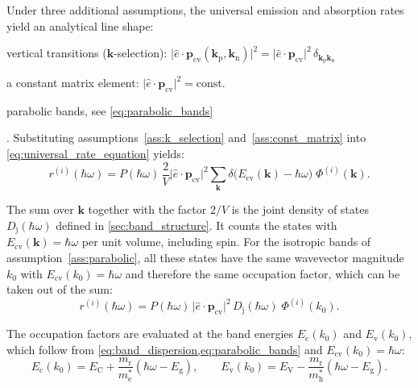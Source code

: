 Under three additional assumptions, the universal emission and absorption rates yield
an analytical line shape:
\begin{enumerate*}[label=(\roman{*}), ref=(\roman{*}), itemjoin={{; }}, itemjoin*={{; and }}]
	\item \label{ass:k_selection} vertical transitions ($\mathbf{k}$-selection):
		$\lvert \hat{e}\cdot \mathbf{p}_{\mathrm{cv}}(\mathbf{k}_{\mathrm{p}},\mathbf{k}
		_{\mathrm{n}}) \rvert^{2}=\lvert \hat{e}\cdot \mathbf{p}_{\mathrm{cv}}\rvert^{2}
		\, \delta_{\mathbf{k}_{\mathrm{p}} \mathbf{k}_{\mathrm{n}}}$
	\item \label{ass:const_matrix} a constant matrix element:
		$\lvert\hat e\cdot\mathbf{p}_{\mathrm{cv}}\rvert^{2}=\mathrm{const.}$
	\item \label{ass:parabolic} parabolic bands, see \cref{eq:parabolic_bands}
\end{enumerate*}.
Substituting assumptions~\ref{ass:k_selection} and~\ref{ass:const_matrix} into
\cref{eq:universal_rate_equation} yields:
\begin{equation}
	r^{(i)}(\hbar\omega)= P(\hbar\omega)\, \frac{2}{V}\lvert\hat e\cdot\mathbf{p}_{\mathrm{cv}}
	\rvert^{2}\sum_{\mathbf{k}}\delta\big(E_{\mathrm{cv}}(\mathbf{k})-\hbar\omega\big
	)\;\Phi^{(i)}(\mathbf{k}).
\end{equation}

The sum over $\mathbf{k}$ together with the factor $2/V$ is the joint density of
states $D_{\mathrm{j}}(\hbar\omega)$ defined in \cref{sec:band_structure}. It counts
the states with $E_{\mathrm{cv}}(\mathbf{k})=\hbar\omega$ per unit volume, including
spin. For the isotropic bands of assumption~\ref{ass:parabolic}, all these states
have the same wavevector magnitude $k_{0}$ with $E_{\mathrm{cv}}(k_{0})=\hbar\omega$
and therefore the same occupation factor, which can be taken out of the sum:
\begin{equation}
	r^{(i)}(\hbar\omega)= P(\hbar\omega)\,\lvert\hat e\cdot\mathbf{p}_{\mathrm{cv}}\rvert^{2}\,
	D_{\mathrm{j}}(\hbar\omega)\;\Phi^{(i)}(k_{0}).
\end{equation}

The occupation factors are evaluated at the band energies $E_{\mathrm{c}}(k_{0})$ and
$E_{\mathrm{v}}(k_{0})$, which follow from \cref{eq:band_dispersion,eq:parabolic_bands}
and $E_{\mathrm{cv}}(k_{0})=\hbar\omega$:
\begin{equation}
	E_{\mathrm{c}}(k_{0})=E_{\mathrm{C}}+\frac{m_{\mathrm{r}}}{m_{\mathrm{e}}^{*}}(\hbar
	\omega-E_{\mathrm{g}}),\qquad E_{\mathrm{v}}(k_{0})=E_{\mathrm{V}}-\frac{m_{\mathrm{r}}}{m_{\mathrm{h}}^{*}}
	(\hbar\omega-E_{\mathrm{g}}).
\end{equation}

